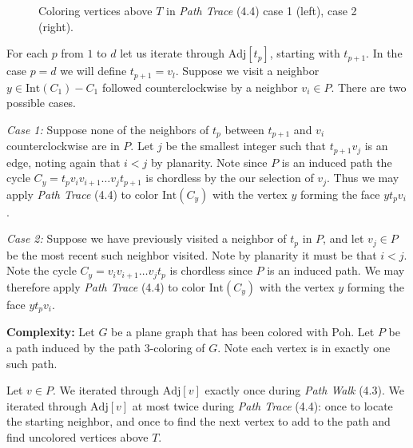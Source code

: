 \documentclass[letterpaper, 12pt]{article}
\theoremstyle{definition}
\theoremstyle{definition}
\theoremstyle{thm}
\theoremstyle{definition}
\begin{document}
\begin{figure}
\begin{center}
\caption{Coloring vertices above $T$ in \textit{Path Trace} (4.4) case 1 (left),
case 2 (right).}
\end{center}
\end{figure}

For each $p$ from $1$ to $d$ let us iterate through
$\text{Adj}[t_p]$, starting with $t_{p+1}$. In the case $p=d$ we will define
$t_{p+1}=v_l$. Suppose we visit a neighbor $y\in \text{Int}(C_1)-C_1$ followed
counterclockwise by a neighbor $v_i\in P$. There are two possible cases.

\textit{Case 1:} Suppose none of the neighbors of $t_p$ between $t_{p+1}$ and
$v_i$ counterclockwise are in $P$. Let
$j$ be the smallest integer such that $t_{p+1}v_j$ is an edge, noting again
that $i<j$ by planarity. Note since $P$ is an induced path the cycle
$C_y=t_pv_iv_{i+1}\ldots v_jt_{p+1}$ is chordless by the our selection of $v_j$.
Thus we may apply \textit{Path Trace} (4.4) to color $\text{Int}(C_y)$ with the
vertex $y$ forming the face $yt_pv_i$.

\textit{Case 2:} Suppose we have previously visited a neighbor of $t_p$ in $P$,
and let $v_j\in P$ be the most recent such neighbor visited. Note by planarity
it must be that $i<j$. Note the cycle $C_y=v_iv_{i+1}\ldots v_jt_p$ is chordless
since $P$ is an induced path.
We may therefore apply \textit{Path Trace} (4.4) to color $\text{Int}(C_y)$ with
the vertex $y$ forming the face $yt_pv_i$.

\noindent\textbf{Complexity:} Let $G$ be a plane graph that has been colored
with Poh. Let $P$ be a path induced by the path $3$-coloring of $G$. Note each
vertex is in exactly one such path.

Let $v\in P$. We iterated through $\text{Adj}[v]$ exactly once during
\textit{Path Walk} (4.3). We iterated through $\text{Adj}[v]$ at most twice
during \textit{Path Trace} (4.4): once to locate
the starting neighbor, and once to find the next vertex to add to the path and
find uncolored vertices above $T$.
\end{document}
